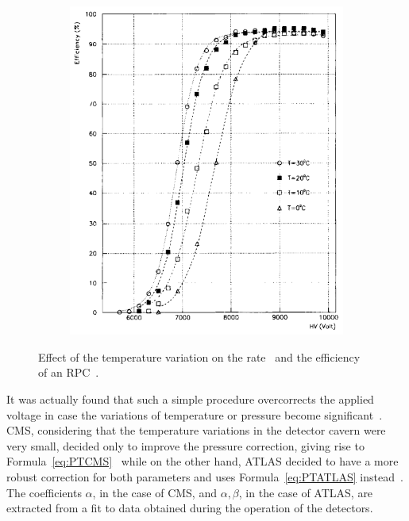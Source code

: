 \begin{figure}
\begin{subfigure}{\linewidth}
			\includegraphics[width = \linewidth]{fig/chapt3/Efficiency-temperature.png}
			\caption{\label{fig:TCorr:B}}
		\end{subfigure}
		\caption{\label{fig:TCorr} Effect of the temperature variation on the rate~ and the efficiency~ of an RPC~\cite{ABBRESCIA1995}.}
	\end{figure}
	
	It was actually found that such a simple procedure overcorrects the applied voltage in case the variations of temperature or pressure become significant~\cite{ABBRESCIA2013,FILIP2014,BIANCO2007,BIANCO2009}. CMS, considering that the temperature variations in the detector cavern were very small, decided only to improve the pressure correction, giving rise to Formula~\ref{eq:PTCMS}~\cite{ABBRESCIA2013} while on the other hand, ATLAS decided to have a more robust correction for both parameters and uses Formula~\ref{eq:PTATLAS} instead~\cite{BIANCO2009}. The coefficients $\alpha$, in the case of CMS, and $\alpha,\beta$, in the case of ATLAS, are extracted from a fit to data obtained during the operation of the detectors.
	
